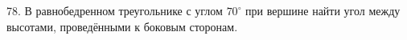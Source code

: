 78. В равнобедренном треугольнике с углом $70^\circ$ при вершине найти угол между высотами, проведёнными к боковым сторонам.\\
